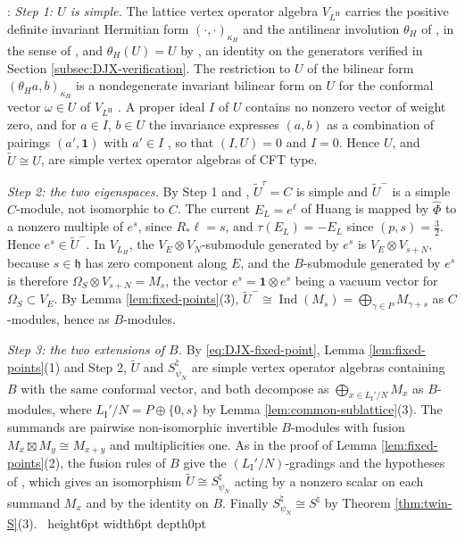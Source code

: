 \documentclass[leqno]{article}
\newcommand{\qed}{\hfill \vrule height6pt  width6pt depth0pt}
\newcommand{\ot}{\otimes}
\DeclareMathOperator{\Ind}{Ind}
\newenvironment{proof}[1][]{\noindent {\it Proof #1} : }{\hbox{~}\qed
\smallskip
}
\numberwithin{equation}{section}
\begin{document}
\begin{proof}
\emph{Step 1: $U$ is simple.} The lattice vertex operator algebra $V_{L^{\mathrm H}}$ carries the positive definite invariant Hermitian form $(\cdot,\cdot)_{\kappa_H}$ and the antilinear involution $\theta_H$ of \cite[Section 4.4]{DJX26}, in the sense of \cite[Theorem 4.12]{DoL14}, and $\theta_H(U) = U$ by \cite[(6.15)]{DJX26}, an identity on the generators verified in Section \ref{subsec:DJX-verification}. The restriction to $U$ of the bilinear form $(\theta_H a,b)_{\kappa_H}$ is a nondegenerate invariant bilinear form on $U$ for the conformal vector $\omega \in U$ of $V_{L^{\mathrm H}}$ \cite[(4.9)]{DJX26}. A proper ideal $I$ of $U$ contains no nonzero vector of weight zero, and for $a \in I$, $b \in U$ the invariance expresses $(a,b)$ as a combination of pairings $(a',\mathbf 1)$ with $a' \in I$ \cite{FHL93,Li94}, so that $(I,U) = 0$ and $I = 0$. Hence $U$, and $\tilde U \cong U$, are simple vertex operator algebras of CFT type.

\emph{Step 2: the two eigenspaces.} By Step 1 and \cite[Theorems 3 and 4.4]{DoM97}, $\tilde U^\tau = C$ is simple and $\tilde U^-$ is a simple $C$-module, not isomorphic to $C$. The current $E_L = e^\ell$ of Huang is mapped by $\hat\Phi$ to a nonzero multiple of $e^{s}$, since $R_*\ell = s$, and $\tau(E_L) = -E_L$ since $(p,s) = \frac32$. Hence $e^s \in \tilde U^-$. In $V_{L_H}$, the $V_E \ot V_N$-submodule generated by $e^s$ is $V_E \ot V_{s+N}$, because $s \in \mathfrak h$ has zero component along $E$, and the $B$-submodule generated by $e^s$ is therefore $\Omega_S \ot V_{s+N} = M_s$, the vector $e^s = \mathbf 1 \ot e^s$ being a vacuum vector for $\Omega_S \subset V_E$. By Lemma \ref{lem:fixed-points}(3), $\tilde U^- \cong \Ind(M_s) = \bigoplus_{\gamma \in P} M_{\gamma+s}$ as $C$-modules, hence as $B$-modules.

\emph{Step 3: the two extensions of $B$.} By \eqref{eq:DJX-fixed-point}, Lemma \ref{lem:fixed-points}(1) and Step 2, $\tilde U$ and $S^\natural_{\psi_N}$ are simple vertex operator algebras containing $B$ with the same conformal vector, and both decompose as $\bigoplus_{x \in L_{\mathrm I}'/N} M_x$ as $B$-modules, where $L_{\mathrm I}'/N = P \oplus \{0,s\}$ by Lemma \ref{lem:common-sublattice}(3). The summands are pairwise non-isomorphic invertible $B$-modules with fusion $M_x \boxtimes M_y \cong M_{x+y}$ and multiplicities one. As in the proof of Lemma \ref{lem:fixed-points}(2), the fusion rules of $B$ give the $(L_{\mathrm I}'/N)$-gradings and the hypotheses of \cite[Proposition 5.3]{DoM04}, which gives an isomorphism $\tilde U \cong S^\natural_{\psi_N}$ acting by a nonzero scalar on each summand $M_x$ and by the identity on $B$. Finally $S^\natural_{\psi_N} \cong S^\natural$ by Theorem \ref{thm:twin-S}(3).
\end{proof}
\end{document}
